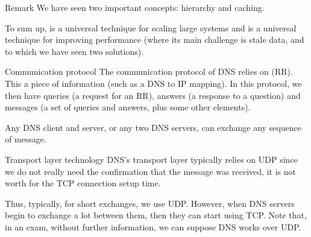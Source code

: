 \documentclass[a4paper]{article}
\begin{document}
\begin{parag}{Remark}
    We have seen two important concepts: hierarchy and caching.

    To sum up,  is a universal technique for scaling large systems and  is a universal technique for improving performance (where its main challenge is stale data, and to which we have seen two solutions).
\end{parag}


\begin{parag}{Communication protocol}
    The communication protocol of DNS relies on  (RR). This a piece of information (such as a DNS to IP mapping). In this protocol, we then have queries (a request for an RR), answers (a response to a question) and messages (a set of queries and answers, plus some other elements). 

    Any DNS client and server, or any two DNS servers, can exchange any sequence of message.
\end{parag}

\begin{parag}{Transport layer technology}
    DNS's transport layer typically relies on UDP since we do not really need the confirmation that the message was received, it is not worth for the TCP connection setup time. 

    Thus, typically, for short exchanges, we use UDP. However, when DNS servers begin to exchange a lot between them, then they can start using TCP. Note that, in an exam, without further information, we can suppose DNS works over UDP.
\end{parag}
\end{document}

